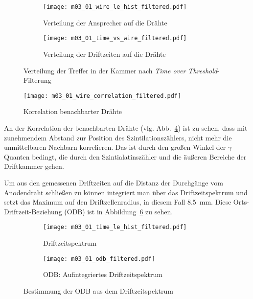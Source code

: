 \documentclass[11pt, ngerman, fleqn, DIV=15, headinclude, BCOR=2cm]{scrreprt}
\begin{document}
\begin{figure}
	\centering
	\begin{subfigure}{0.49 \linewidth}
		\texttt{[image: m03\_01\_wire\_le\_hist\_filtered.pdf]}
		\caption{%
			Verteilung der Ansprecher auf die Drähte
		}
		\label{fig:m03_wire_le_hist_filtered}
	\end{subfigure}
	\begin{subfigure}{0.49 \linewidth}
		\texttt{[image: m03\_01\_time\_vs\_wire\_filtered.pdf]}
		\caption{%
			Verteilung der Driftzeiten auf die Drähte
		}
		\label{fig:m03_time_vs_wire_filtered}
	\end{subfigure}
	\caption{%
		Verteilung der Treffer in der Kammer nach \emph{Time over
		Threshold}-Filterung
	}
	\label{fig:m03_verteilung_in_der_kammer_mit_ToT}
\end{figure}

\begin{figure}
	\centering
	\texttt{[image: m03\_01\_wire\_correlation\_filtered.pdf]}
	\caption{%
		Korrelation benachbarter Drähte
	}
	\label{fig:m03_wire_correlation}
\end{figure}

An der Korrelation der benachbarten Drähte (vlg. 
Abb.~\ref{fig:m03_wire_correlation}) ist zu sehen, dass mit zunehmendem Abstand
zur Position des Szintilationszählers, nicht mehr die unmittelbaren Nachbarn
korrelieren.
Das ist durch den großen Winkel der $\gamma$ Quanten bedingt, die durch den
Szintialatinszähler und die äußeren Bereiche der Driftkammer gehen.

Um aus den gemessenen Driftzeiten auf die Distanz der Durchgänge vom
Anodendraht schließen zu können integriert man über das Driftzeitspektrum und
setzt das Maximum auf den Driftzellenradius, in diesem Fall
\SI{8.5}{\milli\metre}. Diese Orts-Driftzeit-Beziehung (ODB) ist in
Abbildung~\ref{fig:m03_odb_filtered} zu sehen.


\begin{figure}
	\centering
	\begin{subfigure}{0.49 \linewidth}
		\texttt{[image: m03\_01\_time\_le\_hist\_filtered.pdf]}
		\caption{%
			Driftzeitspektrum
		}
		\label{fig:m03_time_le_hist_filtered}
	\end{subfigure}
	\begin{subfigure}{0.49 \linewidth}
		\texttt{[image: m03\_01\_odb\_filtered.pdf]}
		\caption{%
			ODB: Aufintegriertes Driftzeitspektrum
		}
		\label{fig:m03_odb_filtered}
	\end{subfigure}
	\caption{%
		Bestimmung der ODB aus dem Driftzeitspektrum
	}
	\label{fig:m03_odb_bestimmung}
\end{figure}
\end{document}
